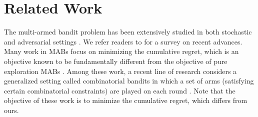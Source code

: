 \documentclass{article}
\newcommand{\Algorithm}{{\small \textsf{CLUCB}}\xspace}
\newcommand{\AlgorithmBud}{{\small \textsf{CSAR}}\xspace}
\newcommand{\Problem}{{CPE}\xspace}
\newcommand{\M}{\mathcal M}
\DeclareMathOperator{\rank}{width}
\begin{document}
\vspace{-1em}
\section{Related Work}
\vspace{-1em}
The multi-armed bandit problem has been extensively studied in both stochastic and adversarial settings \citep{lai1985asymptotically,auer2002nonstochastic,auer2002finite}.
We refer readers to \citep{bubeck2012regret} for a survey on recent advances.
Many work in MABs focus on minimizing the cumulative regret, which is an objective known to be fundamentally different from the objective of pure exploration MABs \citep{bubeck2010pure}.
Among these work, a recent line of research considers a generalized setting called combinatorial bandits in which a set of arms (satisfying certain combinatorial constraints) are played on each round \citep{cesa2012combinatorial,kale2010non,neu2010online,Bubeck12towardsminimax,chen2013combinatorial,gopalan2014thompson,lin2014,kveton2014matroid}.
Note that the objective of these work is to minimize the cumulative regret, which differs from ours.
\end{document}
